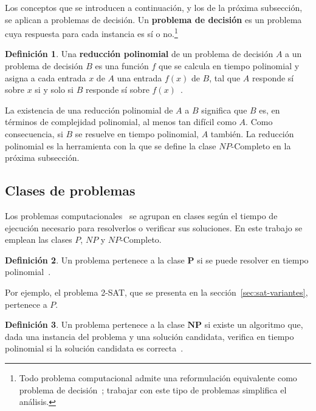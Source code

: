 \documentclass{report}
\theoremstyle{definition}
\newtheorem{definicion}{Definición}[chapter]
\theoremstyle{plain}
\theoremstyle{remark}
\begin{document}
Los conceptos que se introducen a continuación, y los de la próxima
subsección, se aplican a problemas de decisión. Un \textbf{problema
de decisión} es un problema cuya respuesta para cada instancia es sí
o no.\footnote{Todo problema computacional admite una reformulación
equivalente como problema de decisión~\cite{hopcroft2006introduction};
trabajar con este tipo de problemas simplifica el análisis.}

\begin{definicion}
Una \textbf{reducción polinomial} de un problema de decisión $A$ a un
problema de decisión $B$ es una función $f$ que se calcula en tiempo
polinomial y asigna a cada entrada $x$ de $A$ una entrada $f(x)$ de
$B$, tal que $A$ responde sí sobre $x$ si y solo si $B$ responde sí
sobre $f(x)$~\cite{hopcroft2006introduction}.
\end{definicion}

La existencia de una reducción polinomial de $A$ a $B$ significa que
$B$ es, en términos de complejidad polinomial, al menos tan difícil
como $A$. Como consecuencia, si $B$ se resuelve en tiempo polinomial,
$A$ también. La reducción polinomial es la herramienta con la que se
define la clase $NP$-Completo en la próxima subsección.

\subsection{Clases de problemas}

Los problemas computacionales~\cite{hopcroft2006introduction} se
agrupan en clases según el tiempo de ejecución necesario para
resolverlos o verificar sus soluciones. En este trabajo se emplean las
clases $P$, $NP$ y $NP$-Completo.

\begin{definicion}
Un problema pertenece a la clase $\boldsymbol{P}$ si se puede resolver
en tiempo polinomial~\cite{hopcroft2006introduction}.
\end{definicion}

Por ejemplo, el problema 2-SAT, que se presenta en la
sección~\ref{sec:sat-variantes}, pertenece a $P$.

\begin{definicion}
Un problema pertenece a la clase $\boldsymbol{NP}$ si existe un
algoritmo que, dada una instancia del problema y una solución
candidata, verifica en tiempo polinomial si la solución candidata es
correcta~\cite{hopcroft2006introduction}.
\end{definicion}
\end{document}
